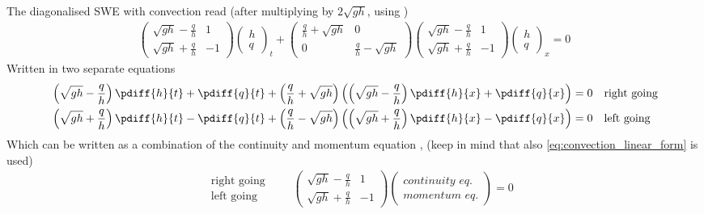 The diagonalised  SWE with convection read (after multiplying by $2\sqrt{gh}$, using  \maplesoft)
\begin{align}
    \begin{pmatrix} \sqrt{gh} - \frac{q}{h} & 1  \\ \sqrt{gh} + \frac{q}{h} & -1 \end{pmatrix}
    \begin{pmatrix} h \\ q \end{pmatrix}_t +
    \begin{pmatrix} \frac{q}{h} + \sqrt{gh}   & 0  \\
        0 & \frac{q}{h} - \sqrt{gh}  \end{pmatrix}
    \begin{pmatrix} \sqrt{gh} - \frac{q}{h} & 1  \\ \sqrt{gh} + \frac{q}{h} & -1 \end{pmatrix}
    \begin{pmatrix} h \\ q \end{pmatrix}_x = 0
\end{align}
%
Written in two separate equations
\begin{align}
    &\left(\sqrt{gh} - \frac{q}{h}\right)\pdiff{h}{t} + \pdiff{q}{t} +  \left( \frac{q}{h} + \sqrt{gh}\right)\left( \left(\sqrt{gh} - \frac{q}{h} \right)\pdiff{h}{x} + \pdiff{q}{x} \right) = 0 \quad \text{right going}
    \\
    &\left(\sqrt{gh} + \frac{q}{h}\right)\pdiff{h}{t} - \pdiff{q}{t} +  \left( \frac{q}{h} - \sqrt{gh}\right)\left( \left(\sqrt{gh} + \frac{q}{h} \right)\pdiff{h}{x} - \pdiff{q}{x} \right) = 0 \quad \text{left going}
\end{align}
Which can be written as a combination of the continuity and momentum equation \citep[eq.\ 4]{Borsboom2001}, (keep in mind that also \autoref{eq:convection_linear_form} is used)
\begin{align}
    \begin{matrix}
    \quad \text{right going} \\
    \quad \text{left going}
\end{matrix}
\qquad
    \begin{pmatrix}
        \sqrt{gh} - \frac{q}{h}  &  1 \\
        \sqrt{gh} + \frac{q}{h}  &  -1
    \end{pmatrix}
    \begin{pmatrix} \textit{continuity eq.} \\ \textit{momentum eq.} \end{pmatrix}    = 0
\end{align}

